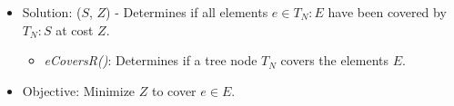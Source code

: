 \documentclass[12pt]{article}
\begin{document}
\begin{itemize}
\begin{itemize}
		\end{itemize} 
		\item Solution: ($S$, $Z$) - Determines if all elements $e \in T_N : E$ have been covered by $T_N : S$ at cost $Z$. 
		\begin{itemize}
			\item \textit{eCoversR()}: Determines if a tree node $T_N$ covers the elements $E$.
		\end{itemize}
		\item Objective: Minimize $Z$ to cover $e \in E$.

	\end{itemize}
	
	
\end{document}
